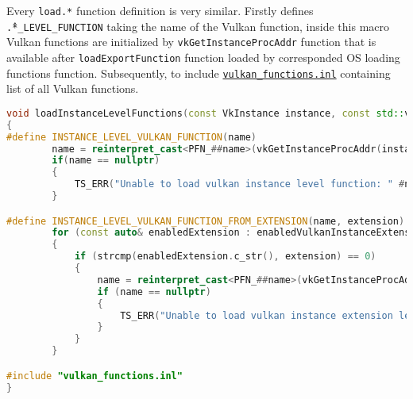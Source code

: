 Every \texttt{load.*} function definition is very similar. Firstly defines \texttt{\^.*\_LEVEL\_FUNCTION} taking the name of the Vulkan function, inside this macro Vulkan functions are initialized by \texttt{vkGetInstanceProcAddr} function that is available after \texttt{loadExportFunction} function loaded by corresponded OS loading functions function. Subsequently, to include \hyperref[lst:vk_functions_inl]{\texttt{vulkan\_functions.inl}} containing list of all Vulkan functions.
\begin{lstlisting}[language=c++, caption=Loading Vulkan functions (./engine/src/vulkan\_tools/vulkan\_loader.cpp)]
void loadInstanceLevelFunctions(const VkInstance instance, const std::vector<std::string>& enabledVulkanInstanceExtensions)
{
#define INSTANCE_LEVEL_VULKAN_FUNCTION(name)                                         \
        name = reinterpret_cast<PFN_##name>(vkGetInstanceProcAddr(instance, #name)); \
        if(name == nullptr)                                                          \
        {                                                                            \
            TS_ERR("Unable to load vulkan instance level function: " #name);     \
        }

#define INSTANCE_LEVEL_VULKAN_FUNCTION_FROM_EXTENSION(name, extension)                                  \
        for (const auto& enabledExtension : enabledVulkanInstanceExtensions)                            \
        {                                                                                               \
            if (strcmp(enabledExtension.c_str(), extension) == 0)                                       \
            {                                                                                           \
                name = reinterpret_cast<PFN_##name>(vkGetInstanceProcAddr(instance, #name));            \
                if (name == nullptr)                                                                    \
                {                                                                                       \
                    TS_ERR("Unable to load vulkan instance extension level function: " #extension); \
                }                                                                                       \
            }                                                                                           \
        }

#include "vulkan_functions.inl"
}
\end{lstlisting}


